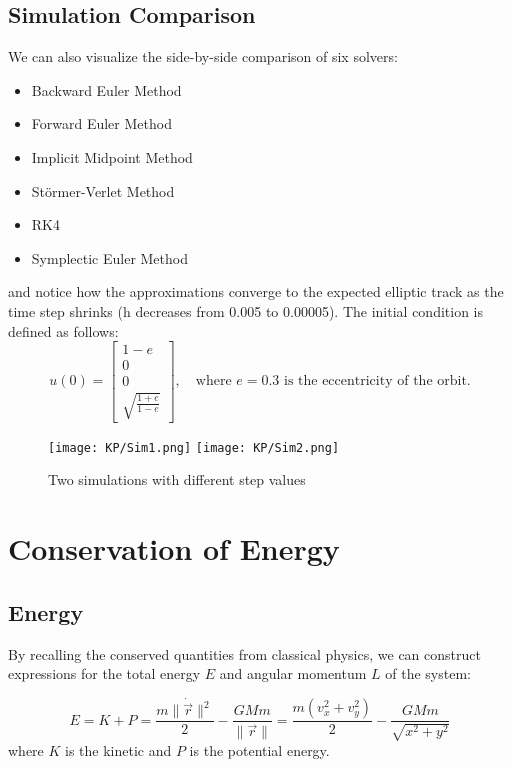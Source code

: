 \documentclass[11pt]{article}
\begin{document}
\subsection{Simulation Comparison}
We can also visualize the side-by-side comparison of six solvers:
\begin{multicols}{2}
\begin{itemize}
    \item Backward Euler Method
    \item Forward Euler Method
    \item Implicit Midpoint Method
    \item Störmer-Verlet Method
    \item RK4
    \item Symplectic Euler Method
\end{itemize}
\end{multicols}
and notice how the approximations converge to the expected elliptic track as the time step shrinks (h decreases from 0.005 to 0.00005). The initial condition is defined as follows:
\[
u(0) = \begin{bmatrix} 1 - e \\ 0 \\ 0 \\ \sqrt{\frac{1+e}{1-e}} \end{bmatrix}, \quad \text{where $e = 0.3$ is the eccentricity of the orbit.}
\] 

\begin{figure}[H]
  \centering
  \texttt{[image: KP/Sim1.png]} \hfill
  \texttt{[image: KP/Sim2.png]} 
  \caption{Two simulations with different step values}
  \label{fig:three-in-line}
\end{figure}

\clearpage

\section{Conservation of  Energy}

\subsection{Energy}

By recalling the conserved quantities from classical physics, we can construct expressions for the total energy $E$ and angular momentum $L$ of the system:

\[
E = K + P = \frac{m \|\dot{\vec{r}}\|^2}{2} - \frac{GMm}{\|\vec{r}\|} = \frac{m(v_x^2 + v_y^2)}{2} - \frac{GMm}{\sqrt{x^2 + y^2}}
\]
where $K$ is the kinetic and $P$ is the potential energy.
\end{document}
